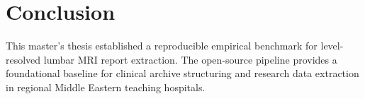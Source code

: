 \section{Conclusion}
This master's thesis established a reproducible empirical benchmark for level-resolved lumbar MRI report extraction. The open-source pipeline provides a foundational baseline for clinical archive structuring and research data extraction in regional Middle Eastern teaching hospitals.
